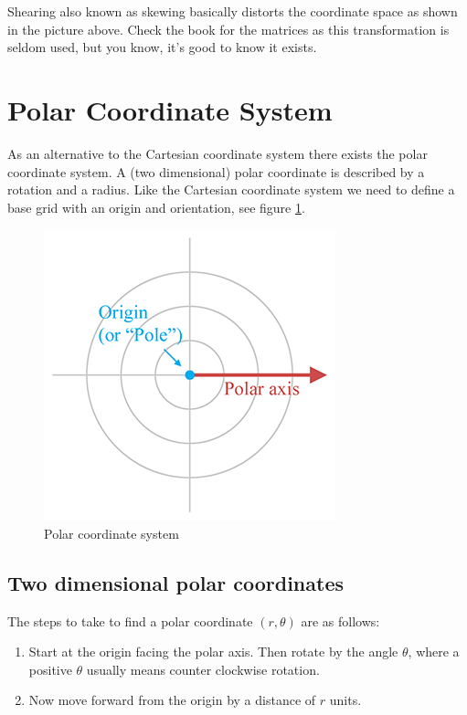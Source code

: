 \documentclass[a4paper,11pt]{article}
\begin{document}
Shearing also known as skewing basically distorts the coordinate space as shown in the picture above. Check the book for the matrices as this transformation is seldom used, but you know, it's good to know it exists.


\newpage
\section{Polar Coordinate System}

As an alternative to the Cartesian coordinate system there exists the polar coordinate system. A (two dimensional) polar coordinate is described by a rotation and a radius. Like the Cartesian coordinate system we need to define a base grid with an origin and orientation, see figure \ref{fig:polar-coordinate-system}.

\begin{figure}[H]
\centering
    \includegraphics{07_polar_coordinate_system}
\caption{Polar coordinate system}
\label{fig:polar-coordinate-system}
\end{figure}

\subsection{Two dimensional polar coordinates}

The steps to take to find a polar coordinate $(r,\theta)$ are as follows: 

\begin{enumerate}
	\item Start at the origin facing the polar axis. Then rotate by the angle $\theta$, where a positive $\theta$ usually means counter clockwise rotation.
	\item Now move forward from the origin by a distance of $r$ units.
\end{enumerate}
\end{document}
